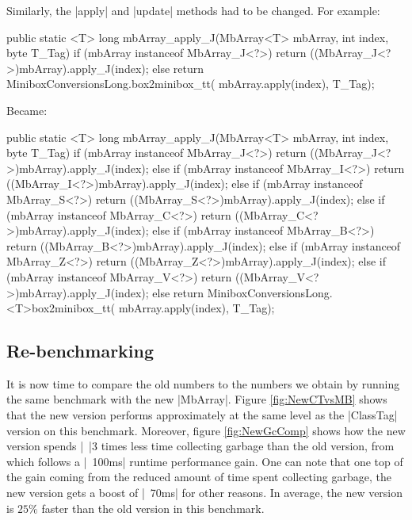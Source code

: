 Similarly, the |apply| and |update| methods had to be changed.
For example:

\begin{lstlisting-nobreak-java}
public static <T> long mbArray_apply_J(MbArray<T> mbArray, int index, byte T_Tag) {
  if (mbArray instanceof MbArray_J<?>)
    return ((MbArray_J<?>)mbArray).apply_J(index);
  else
    return MiniboxConversionsLong.box2minibox_tt(
    	mbArray.apply(index), T_Tag);
}
\end{lstlisting-nobreak-java}

Became:

\begin{lstlisting-nobreak-java}
public static <T> long mbArray_apply_J(MbArray<T> mbArray, int index, byte T_Tag) {
  if (mbArray instanceof MbArray_J<?>)
    return ((MbArray_J<?>)mbArray).apply_J(index);
  else if (mbArray instanceof MbArray_I<?>)
    return ((MbArray_I<?>)mbArray).apply_J(index);
  else if (mbArray instanceof MbArray_S<?>)
    return ((MbArray_S<?>)mbArray).apply_J(index);
  else if (mbArray instanceof MbArray_C<?>)
    return ((MbArray_C<?>)mbArray).apply_J(index);
  else if (mbArray instanceof MbArray_B<?>)
    return ((MbArray_B<?>)mbArray).apply_J(index);
  else if (mbArray instanceof MbArray_Z<?>)
    return ((MbArray_Z<?>)mbArray).apply_J(index);
  else if (mbArray instanceof MbArray_V<?>)
    return ((MbArray_V<?>)mbArray).apply_J(index);
  else
    return MiniboxConversionsLong.<T>box2minibox_tt(
    	mbArray.apply(index), T_Tag);
}
\end{lstlisting-nobreak-java}

\subsection{Re-benchmarking}

It is now time to compare the old numbers to the numbers we obtain by running the same benchmark with the new |MbArray|. Figure \ref{fig:NewCTvsMB} shows that the new version performs approximately at the same level as the |ClassTag| version on this benchmark. Moreover, figure \ref{fig:NewGcComp} shows how the new version spends |~|3 times less time collecting garbage than the old version, from which follows a |~100ms| runtime performance gain. One can note that one top of the gain coming from the reduced amount of time spent collecting garbage, the new version gets a boost of |~70ms| for other reasons. In average, the new version is $25\%$ faster than the old version in this benchmark.

